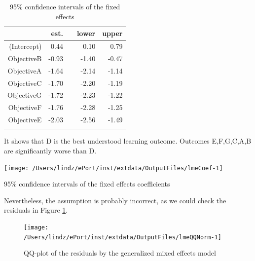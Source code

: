 \documentclass[12pt,english,nohyper]{tufte-handout}\usepackage[]{graphicx}\usepackage[]{color}
\newenvironment{knitrout}{}{} %
\begin{document}
\begin{longtable}{rrlrr}
  \hline
 & est. &    & lower & upper \\ 
  \hline
(Intercept) & 0.44 &  & 0.10 & 0.79 \\ 
  ObjectiveB & -0.93 &  & -1.40 & -0.47 \\ 
  ObjectiveA & -1.64 &  & -2.14 & -1.14 \\ 
  ObjectiveC & -1.70 &  & -2.20 & -1.19 \\ 
  ObjectiveG & -1.72 &  & -2.23 & -1.22 \\ 
  ObjectiveF & -1.76 &  & -2.28 & -1.25 \\ 
  ObjectiveE & -2.03 &  & -2.56 & -1.49 \\ 
   \hline
\hline
\caption{95\% confidence intervals of the fixed effects} 
\label{tab:lme_fixed}
\end{longtable}


It shows that D is the best understood learning outcome.
Outcomes E,F,G,C,A,B are
significantly worse than D.



\begin{knitrout}
\color{fgcolor}\begin{marginfigure}
\texttt{[image: /Users/lindz/ePort/inst/extdata/OutputFiles/lmeCoef-1]} \caption[95\% confidence intervals of the fixed effects coefficients]{95\% confidence intervals of the fixed effects coefficients}\label{mar:lmeCoef}
\end{marginfigure}


\end{knitrout}

Nevertheless, the assumption is probably incorrect, as we could check the residuals in
Figure \ref{fig:lmeQQNorm}.

\begin{knitrout}
\color{fgcolor}\begin{figure}

{\centering \texttt{[image: /Users/lindz/ePort/inst/extdata/OutputFiles/lmeQQNorm-1]} 

}

\caption[QQ-plot of the residuals by the generalized mixed effects model]{QQ-plot of the residuals by the generalized mixed effects model}\label{fig:lmeQQNorm}
\end{figure}


\end{knitrout}
\end{document}
